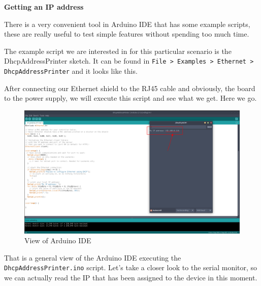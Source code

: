 \vspace{7mm}

\textbf{Getting an IP address}

There is a very convenient tool in Arduino IDE that has some example scripts, these are really useful to test simple features without spending too much time.

The example script we are interested in for this particular scenario is the DhcpAddressPrinter sketch. It can be found in \verb|File > Examples > Ethernet > DhcpAddressPrinter| and it looks like this.

\vspace{5mm}



\vspace{7mm}

After connecting our Ethernet shield to the RJ45 cable and obviously, the board to the power supply, we will execute this script and see what we get. Here we go.

\begin{figure}[H]
    \centering
    \includegraphics[width=1\textwidth]{fig/assign-ip.png}
    \caption{View of Arduino IDE}
    \label{fig:assign-ip}
\end{figure}

That is a general view of the Arduino IDE executing the \verb|DhcpAddressPrinter.ino| script. Let's take a closer look to the serial monitor, so we can actually read the IP that has been assigned to the device in this moment.


